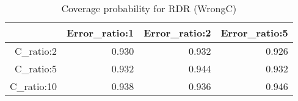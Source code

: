 \begin{table}[ht]
\centering
\begin{tabular}{rrrr}
  \hline
 & Error\_ratio:1 & Error\_ratio:2 & Error\_ratio:5 \\ 
  \hline
C\_ratio:2 & 0.930 & 0.932 & 0.926 \\ 
  C\_ratio:5 & 0.932 & 0.944 & 0.932 \\ 
  C\_ratio:10 & 0.938 & 0.936 & 0.946 \\ 
   \hline
\end{tabular}
\caption{Coverage probability for RDR (WrongC)} 
\end{table}

